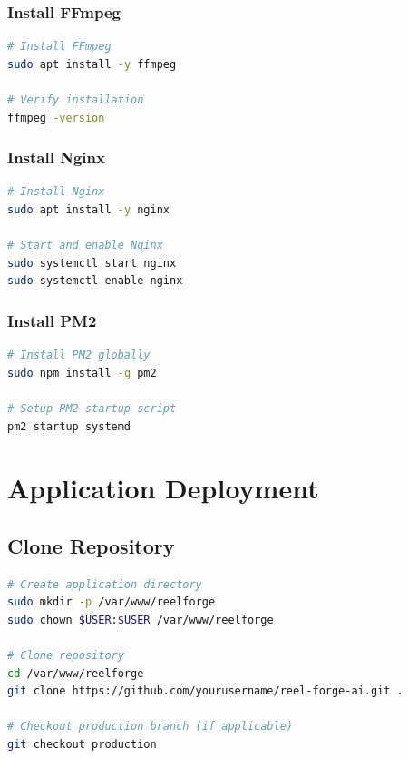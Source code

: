 \subsubsection{Install FFmpeg}

\begin{lstlisting}[language=bash]
# Install FFmpeg
sudo apt install -y ffmpeg

# Verify installation
ffmpeg -version
\end{lstlisting}

\subsubsection{Install Nginx}

\begin{lstlisting}[language=bash]
# Install Nginx
sudo apt install -y nginx

# Start and enable Nginx
sudo systemctl start nginx
sudo systemctl enable nginx
\end{lstlisting}

\subsubsection{Install PM2}

\begin{lstlisting}[language=bash]
# Install PM2 globally
sudo npm install -g pm2

# Setup PM2 startup script
pm2 startup systemd
\end{lstlisting}

\section{Application Deployment}

\subsection{Clone Repository}

\begin{lstlisting}[language=bash]
# Create application directory
sudo mkdir -p /var/www/reelforge
sudo chown $USER:$USER /var/www/reelforge

# Clone repository
cd /var/www/reelforge
git clone https://github.com/yourusername/reel-forge-ai.git .

# Checkout production branch (if applicable)
git checkout production
\end{lstlisting}

